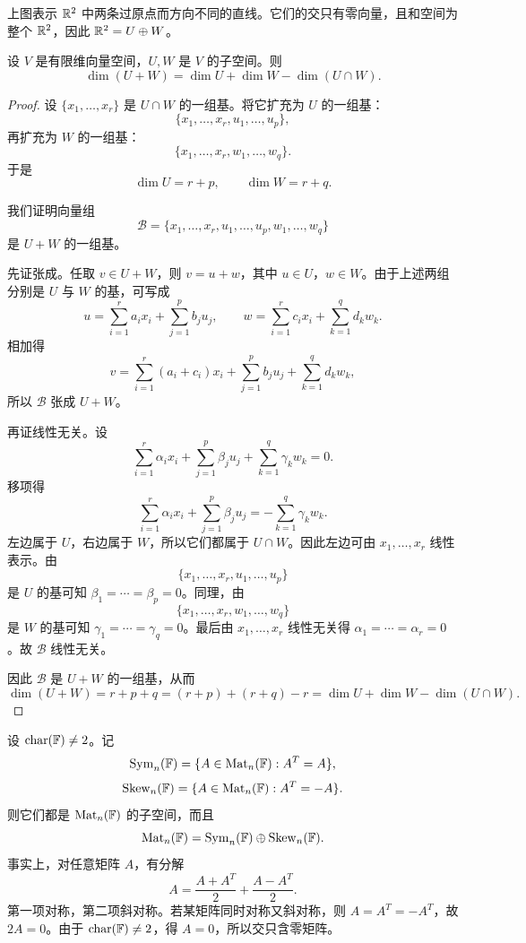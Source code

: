 \begin{center}
\end{center}

上图表示 $\mathbb{R}^2$ 中两条过原点而方向不同的直线。它们的交只有零向量，且和空间为整个 $\mathbb{R}^2$，因此 $\mathbb{R}^2=U\oplus W$。

\begin{theorem}[维数公式]
设 $V$ 是有限维向量空间，$U,W$ 是 $V$ 的子空间。则
\[
\dim(U+W)=\dim U+\dim W-\dim(U\cap W).
\]
\end{theorem}

\begin{proof}
设 $\{x_1,\dots,x_r\}$ 是 $U\cap W$ 的一组基。将它扩充为 $U$ 的一组基：
\[
\{x_1,\dots,x_r,u_1,\dots,u_p\},
\]
再扩充为 $W$ 的一组基：
\[
\{x_1,\dots,x_r,w_1,\dots,w_q\}.
\]
于是
\[
\dim U=r+p,\qquad \dim W=r+q.
\]

我们证明向量组
\[
\mathcal B=\{x_1,\dots,x_r,u_1,\dots,u_p,w_1,\dots,w_q\}
\]
是 $U+W$ 的一组基。

先证张成。任取 $v\in U+W$，则 $v=u+w$，其中 $u\in U$，$w\in W$。由于上述两组分别是 $U$ 与 $W$ 的基，可写成
\[
u=\sum_{i=1}^r a_i x_i+\sum_{j=1}^p b_j u_j,
\qquad
w=\sum_{i=1}^r c_i x_i+\sum_{k=1}^q d_k w_k.
\]
相加得
\[
v=\sum_{i=1}^r (a_i+c_i)x_i+\sum_{j=1}^p b_j u_j+\sum_{k=1}^q d_k w_k,
\]
所以 $\mathcal B$ 张成 $U+W$。

再证线性无关。设
\[
\sum_{i=1}^r \alpha_i x_i+\sum_{j=1}^p \beta_j u_j+\sum_{k=1}^q \gamma_k w_k=0.
\]
移项得
\[
\sum_{i=1}^r \alpha_i x_i+\sum_{j=1}^p \beta_j u_j
=
-\sum_{k=1}^q \gamma_k w_k.
\]
左边属于 $U$，右边属于 $W$，所以它们都属于 $U\cap W$。因此左边可由 $x_1,\dots,x_r$ 线性表示。由
\[
\{x_1,\dots,x_r,u_1,\dots,u_p\}
\]
是 $U$ 的基可知 $\beta_1=\cdots=\beta_p=0$。同理，由
\[
\{x_1,\dots,x_r,w_1,\dots,w_q\}
\]
是 $W$ 的基可知 $\gamma_1=\cdots=\gamma_q=0$。最后由 $x_1,\dots,x_r$ 线性无关得 $\alpha_1=\cdots=\alpha_r=0$。故 $\mathcal B$ 线性无关。

因此 $\mathcal B$ 是 $U+W$ 的一组基，从而
\[
\dim(U+W)=r+p+q=(r+p)+(r+q)-r=\dim U+\dim W-\dim(U\cap W).
\]
\end{proof}

\begin{example}[对称矩阵与斜对称矩阵]
设 $\mathrm{char}(\mathbb{F})\ne 2$。记
\[
\mathrm{Sym}_n(\mathbb{F})=\{A\in\mathrm{Mat}_n(\mathbb{F}):A^T=A\},
\]
\[
\mathrm{Skew}_n(\mathbb{F})=\{A\in\mathrm{Mat}_n(\mathbb{F}):A^T=-A\}.
\]
则它们都是 $\mathrm{Mat}_n(\mathbb{F})$ 的子空间，而且
\[
\mathrm{Mat}_n(\mathbb{F})=\mathrm{Sym}_n(\mathbb{F})\oplus \mathrm{Skew}_n(\mathbb{F}).
\]
事实上，对任意矩阵 $A$，有分解
\[
A=\frac{A+A^T}{2}+\frac{A-A^T}{2}.
\]
第一项对称，第二项斜对称。若某矩阵同时对称又斜对称，则 $A=A^T=-A^T$，故 $2A=0$。由于 $\mathrm{char}(\mathbb{F})\ne 2$，得 $A=0$，所以交只含零矩阵。
\end{example}


